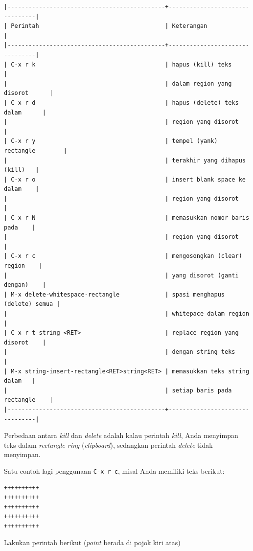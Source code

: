 \documentclass{article}
\begin{document}
\begin{verbatim}
|---------------------------------------------+--------------------------------|
| Perintah                                    | Keterangan                     |
|---------------------------------------------+--------------------------------|
| C-x r k                                     | hapus (kill) teks              |
|                                             | dalam region yang disorot      |
| C-x r d                                     | hapus (delete) teks dalam      |
|                                             | region yang disorot            |
| C-x r y                                     | tempel (yank) rectangle        |
|                                             | terakhir yang dihapus (kill)   |
| C-x r o                                     | insert blank space ke dalam    |
|                                             | region yang disorot            |
| C-x r N                                     | memasukkan nomor baris pada    |
|                                             | region yang disorot            |
| C-x r c                                     | mengosongkan (clear) region    |
|                                             | yang disorot (ganti dengan)    |
| M-x delete-whitespace-rectangle             | spasi menghapus (delete) semua |
|                                             | whitepace dalam region         |
| C-x r t string <RET>                        | replace region yang disorot    |
|                                             | dengan string teks             |
| M-x string-insert-rectangle<RET>string<RET> | memasukkan teks string dalam   |
|                                             | setiap baris pada rectangle    |
|---------------------------------------------+--------------------------------|
\end{verbatim}

Perbedaan antara \emph{kill} dan \emph{delete} adalah kalau perintah
\emph{kill}, Anda menyimpan teks dalam \emph{rectangle ring} 
(\emph{clipboard}), sedangkan perintah \emph{delete} tidak menyimpan.

Satu contoh lagi penggunaan \verb=C-x r c=, misal Anda memiliki teks berikut:

\begin{verbatim}
++++++++++
++++++++++
++++++++++
++++++++++
++++++++++
\end{verbatim}

Lakukan perintah berikut (\emph{point} berada di pojok kiri atas)
\end{document}
